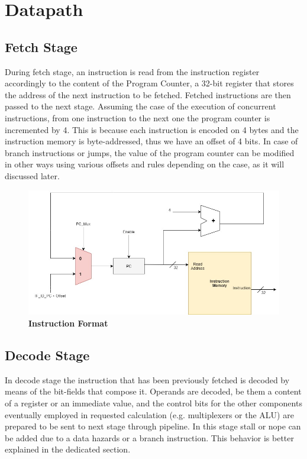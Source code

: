 %
 
\chapter{Datapath}
\label{cha2}
\section{Fetch Stage}
During fetch stage, an instruction is read from the instruction register accordingly to the content of the Program Counter, a 32-bit register that stores the address 
of the next instruction to be fetched. Fetched instructions are then passed to the next stage.
Assuming the case of the execution of concurrent instructions, from one instruction to the next one the program counter is incremented by 4. This is because each instruction 
is encoded on 4 bytes and the instruction memory is byte-addressed, thus we have an offset of 4 bits.
In case of branch instructions or jumps, the value of the program counter can be modified in other ways using various offsets and rules depending on the case, 
as it will discussed later.

\begin{figure}[!h]
    \centering
        \includegraphics[width=\linewidth]{schematic/InstructionMemory_withProgramCounter.jpg}
        \caption{\textbf{Instruction Format}}
\end{figure}
    

\section{Decode Stage}

In decode stage the instruction that has been previously fetched is decoded by means of the bit-fields that compose it.
Operands are decoded, be them a content of a register or an immediate value, and the control bits for the other components eventually employed in requested calculation 
(e.g. multiplexers or the ALU) are prepared to be sent to next stage through pipeline. In this stage stall or nope can be 
added due to a data hazards or a branch instruction. This behavior is better explained in the dedicated section.

